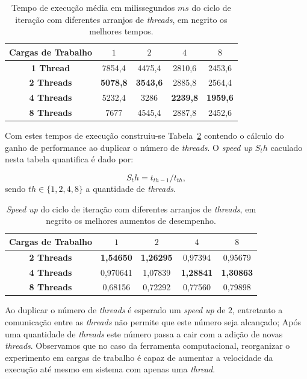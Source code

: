 \begin{table}[!htbp]
	\caption{Tempo de execução média em milissegundos $ms$ do ciclo de iteração com diferentes arranjos de \textit{threads}, em negrito os melhores tempos.}
	\centering{}
	\begin{tabular}{c|c|c|c|c}
		\toprule 
		\textbf{Cargas de Trabalho}	& $1$ & $2$ & $4$  & $8$\\ 
		\midrule 
		\textbf{1 Thread} & 7854,4 &	4475,4 &	2810,6 &	2453,6\\ 
		\midrule 
		\textbf{2 Threads} & \textbf{5078,8} &	\textbf{3543,6} &	2885,8 &	2564,4\\ 
		\midrule 
		\textbf{4 Threads} & 5232,4 &	3286 &	\textbf{2239,8} &	\textbf{1959,6}\\ 
		\midrule 
		\textbf{8 Threads} & 7677 &	4545,4 &	2887,8 &	2452,6
		
		\\ 
		\bottomrule 
	\end{tabular} 
	\label{tab1:medium}
\end{table}

Com estes tempos de execução construiu-se Tabela~\ref{tab1:speedup} contendo o cálculo do ganho de performance ao duplicar o número de \textit{threads}. O \textit{speed up} $S_th$ caculado nesta tabela quantifica é dado por:

\begin{equation}
	S_th = t_{th-1}/t_{th},
	\label{eq:speedup1}
\end{equation}
sendo $th \in \{1,2,4,8\}$ a quantidade de \textit{threads}.

\begin{table}[!htbp]
\caption{\textit{Speed up} do ciclo de iteração com diferentes arranjos de \textit{threads}, em negrito os melhores aumentos de desempenho.}
\centering{}
\begin{tabular}{c|c|c|c|c}
	\toprule 
	\textbf{Cargas de Trabalho}	& $1$ & $2$ & $4$  & $8$\\ 
	\midrule 
	\textbf{2 Threads} & \textbf{1,54650} &	\textbf{1,26295} & 0,97394 &	0,95679\\ 
	\midrule 
	\textbf{4 Threads} & 0,970641 &	1,07839 &	\textbf{1,28841} & \textbf{1,30863}\\ 
	\midrule 
	\textbf{8 Threads} & 0,68156 &	0,72292 & 0,77560 & 0,79898
	\\ 
	\bottomrule 
\end{tabular} 
\label{tab1:speedup}
\end{table}

Ao duplicar o número de \textit{threads} é esperado um \textit{speed up} de $2$, entretanto a comunicação entre as \textit{threads} não permite que este número seja alcançado; Após uma quantidade de \textit{threads} este número passa a cair com a adição de novas \textit{threads}. Observamos que no caso da ferramenta computacional, reorganizar o experimento em cargas de trabalho é capaz de aumentar a velocidade da execução até mesmo em sistema com apenas uma \textit{thread}.

